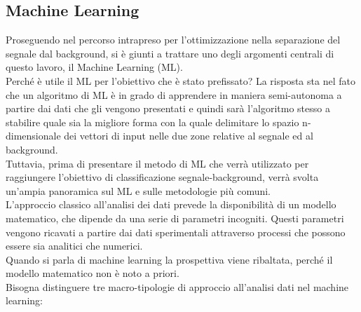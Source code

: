 \newpage

\subsection{Machine Learning}
\label{ML}
Proseguendo nel percorso intrapreso per l'ottimizzazione nella separazione del segnale dal background, si è giunti a trattare uno degli argomenti centrali di questo lavoro, il Machine Learning (ML).\\
Perché è utile il ML per l'obiettivo che è stato prefissato? La risposta sta nel fato che un algoritmo di ML è in grado di apprendere in maniera semi-autonoma a partire dai dati che gli vengono presentati e quindi sarà l'algoritmo stesso a stabilire quale sia la migliore forma con la quale delimitare lo spazio n-dimensionale dei vettori di input nelle due zone relative al segnale ed al background. \\
Tuttavia, prima di presentare il metodo di ML che verrà utilizzato per raggiungere l'obiettivo di classificazione segnale-background, verrà svolta un'ampia panoramica sul ML e sulle metodologie più comuni. \\
L'approccio classico all'analisi dei dati prevede la disponibilità di un modello matematico, che dipende da una serie di parametri incogniti. Questi parametri vengono ricavati a partire dai dati sperimentali attraverso processi che possono essere sia analitici che numerici. \\
Quando si parla di machine learning la prospettiva viene ribaltata, perché il modello matematico non è noto a priori. \\
Bisogna distinguere tre macro-tipologie di approccio all'analisi dati nel machine learning:
